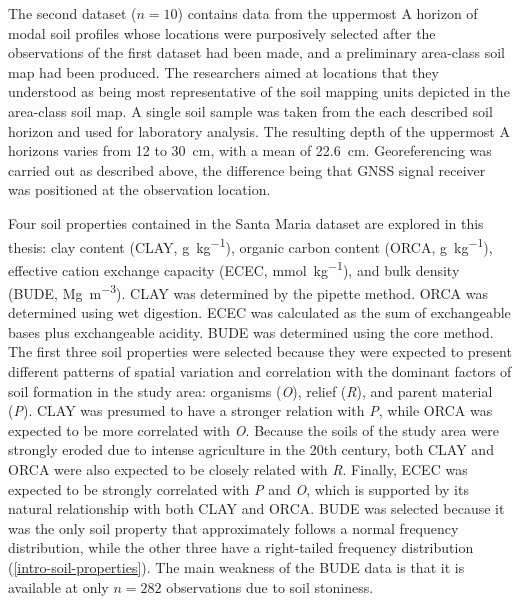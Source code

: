 The second dataset ($n = 10$) contains data from the uppermost A horizon of modal soil profiles
whose locations were purposively selected after the observations of the first dataset had been made,
and a preliminary area-class soil map had been produced. The researchers aimed at locations that
they understood as being most representative of the soil mapping units depicted in the area-class
soil map. A single soil sample was taken from the each described soil horizon and used for
laboratory analysis. The resulting depth of the uppermost A horizons varies from \num{12} to
\SI{30}{\centi\metre}, with a mean of \SI{22.6}{\centi\metre}. Georeferencing was carried out as
described above, the difference being that GNSS signal receiver was positioned at the observation
location.

Four soil properties contained in the Santa Maria dataset are explored in this thesis: clay content
(CLAY, \si{\gram\per\kilo\gram}), organic carbon content (ORCA, \si{\gram\per\kilo\gram}), effective
cation exchange capacity (ECEC, \si{\milli\mole\per\kilo\gram}), and bulk density (BUDE,
\si{\mega\gram\per\cubic\metre}). CLAY was determined by the pipette method. ORCA was determined
using wet digestion. ECEC was calculated as the sum of exchangeable bases plus exchangeable acidity.
BUDE was determined using the core method. The first three soil properties were selected because
they were expected to present different patterns of spatial variation and correlation with the
dominant factors of soil formation in the study area: organisms (\textit{O}), relief (\textit{R}),
and parent material (\textit{P}). CLAY was presumed to have a stronger relation with \textit{P},
while ORCA was expected to be more correlated with \textit{O}. Because the soils of the study area
were strongly eroded due to intense agriculture in the 20th century, both CLAY and ORCA were also
expected to be closely related with \textit{R}. Finally, ECEC was expected to be strongly correlated
with \textit{P} and \textit{O}, which is supported by its natural relationship with both CLAY and
ORCA. BUDE was selected because it was the only soil property that approximately follows a normal
frequency distribution, while the other three have a right-tailed frequency distribution
(\autoref{intro-soil-properties}). The main weakness of the BUDE data is that it is available at
only $n = 282$ observations due to soil stoniness.

